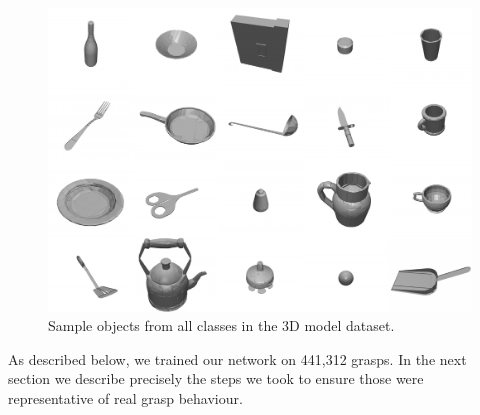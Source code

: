 \begin{figure}
  \includegraphics[width=\linewidth]{images/allObjects.pdf}
  \caption{Sample objects from all classes in the 3D model dataset.}
  \label{fig:allObjects}
\end{figure}
As described below, we trained our network on 441,312 grasps. In the next section we describe precisely the steps we took to ensure those were representative of real grasp behaviour. %


